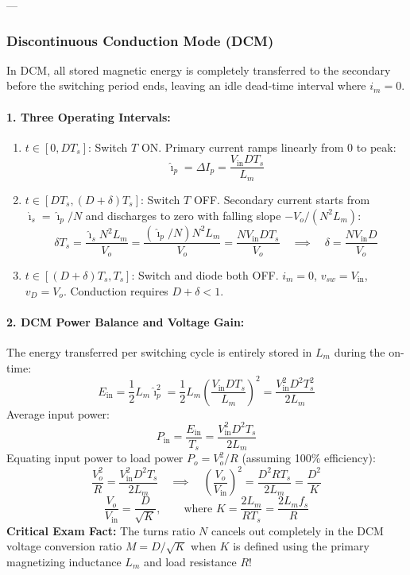 ---

\subsubsection{Discontinuous Conduction Mode (DCM)}
In DCM, all stored magnetic energy is completely transferred to the secondary before the switching period ends, leaving an idle dead-time interval where $i_m = 0$.

\paragraph{1. Three Operating Intervals:}
\begin{enumerate}
  \item $t \in [0, D T_s]$: Switch $T$ ON. Primary current ramps linearly from $0$ to peak:
  \[
  \hat{\imath}_p = \Delta I_p = \frac{V_{\mathrm{in}} D T_s}{L_m}
  \]
  \item $t \in [D T_s, (D+\delta) T_s]$: Switch $T$ OFF. Secondary current starts from $\hat{\imath}_s = \hat{\imath}_p / N$ and discharges to zero with falling slope $-V_o / (N^2 L_m)$:
  \[
  \delta T_s = \frac{\hat{\imath}_s N^2 L_m}{V_o} = \frac{(\hat{\imath}_p / N) N^2 L_m}{V_o} = \frac{N V_{\mathrm{in}} D T_s}{V_o} \quad\implies\quad \delta = \frac{N V_{\mathrm{in}} D}{V_o}
  \]
  \item $t \in [(D+\delta) T_s, T_s]$: Switch and diode both OFF. $i_m = 0$, $v_{sw} = V_{\mathrm{in}}$, $v_D = V_o$. Conduction requires $D + \delta < 1$.
\end{enumerate}

\paragraph{2. DCM Power Balance and Voltage Gain:}
The energy transferred per switching cycle is entirely stored in $L_m$ during the on-time:
\[
E_{\mathrm{in}} = \frac{1}{2} L_m \hat{\imath}_p^2 = \frac{1}{2} L_m \left(\frac{V_{\mathrm{in}} D T_s}{L_m}\right)^2 = \frac{V_{\mathrm{in}}^2 D^2 T_s^2}{2 L_m}
\]
Average input power:
\[
P_{\mathrm{in}} = \frac{E_{\mathrm{in}}}{T_s} = \frac{V_{\mathrm{in}}^2 D^2 T_s}{2 L_m}
\]
Equating input power to load power $P_o = V_o^2 / R$ (assuming 100\% efficiency):
\[
\frac{V_o^2}{R} = \frac{V_{\mathrm{in}}^2 D^2 T_s}{2 L_m} \quad\implies\quad \left(\frac{V_o}{V_{\mathrm{in}}}\right)^2 = \frac{D^2 R T_s}{2 L_m} = \frac{D^2}{K}
\]
\begin{equation}
\frac{V_o}{V_{\mathrm{in}}} = \frac{D}{\sqrt{K}}, \qquad \text{where } K = \frac{2 L_m}{R T_s} = \frac{2 L_m f_s}{R}
\end{equation}
\noindent\textbf{Critical Exam Fact:} The turns ratio $N$ cancels out completely in the DCM voltage conversion ratio $M = D/\sqrt{K}$ when $K$ is defined using the primary magnetizing inductance $L_m$ and load resistance $R$!

